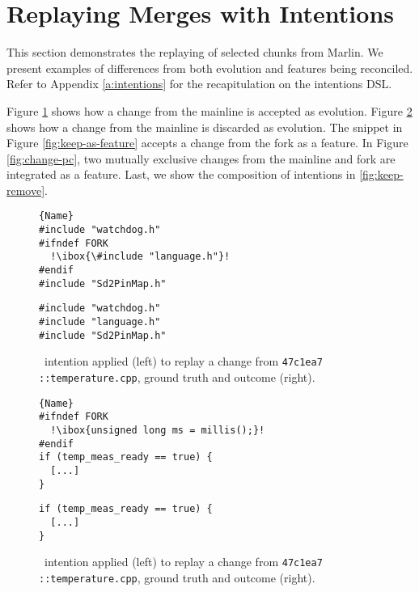 \section{Replaying Merges with Intentions}
This section demonstrates the replaying of selected chunks from Marlin. We present examples of differences from both evolution and features being reconciled. Refer to Appendix \ref{a:intentions} for the recapitulation on the intentions DSL.

Figure \ref{fig:ex-keep} shows how a change from the mainline is accepted as evolution. Figure \ref{fig:ex-remove} shows how a change from the mainline is discarded as evolution. The snippet in Figure \ref{fig:keep-as-feature} accepts a change from the fork as a feature. In Figure \ref{fig:change-pc}, two mutually exclusive changes from the mainline and fork are integrated as a feature. Last, we show the composition of intentions in \ref{fig:keep-remove}.

\begin{figure}[ht]
    \centering
    \begin{minipage}{.35\textwidth}
\begin{lstlisting}[caption=Wrapped code by PC,escapechar=!]{Name}
#include "watchdog.h"
#ifndef FORK
  !\ibox{\#include "language.h"}!
#endif
#include "Sd2PinMap.h"
\end{lstlisting}
\end{minipage}\qquad
\begin{minipage}{.35\textwidth}
\begin{lstlisting}
#include "watchdog.h"
#include "language.h"
#include "Sd2PinMap.h"
\end{lstlisting}

    \end{minipage}
    \caption{\keep~intention applied (left) to replay a change from \texttt{47c1ea7 ::temperature.cpp}, ground truth and outcome (right).}
    \label{fig:ex-keep}
\end{figure}

\begin{figure}[ht]
    \centering
    \begin{minipage}{.45\textwidth}
\begin{lstlisting}[caption=Wrapped code by PC,escapechar=!]{Name}
#ifndef FORK
  !\ibox{unsigned long ms = millis();}!
#endif
if (temp_meas_ready == true) {
  [...]
}
\end{lstlisting}
\end{minipage}\qquad
\begin{minipage}{.45\textwidth}
\begin{lstlisting}
if (temp_meas_ready == true) {
  [...]
}
\end{lstlisting}

    \end{minipage}
    \caption{\remove~intention applied (left) to replay a change from \texttt{47c1ea7 ::temperature.cpp}, ground truth and outcome (right).}
    \label{fig:ex-remove}
\end{figure}


